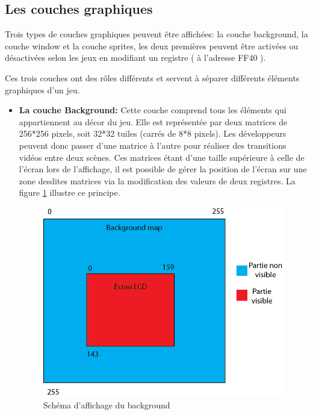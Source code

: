 \documentclass[french]{report}
\begin{document}
\subsection{Les couches graphiques}

Trois types de couches graphiques peuvent être affichées: la couche background, la couche
window et la couche sprites, les deux premières peuvent être activées ou
désactivées selon les jeux en modifiant un registre ( à l'adresse FF40 ).

Ces trois couches ont des rôles différents et servent à séparer différents
éléments graphiques d'un jeu.\\

\begin{itemize}
\item \textbf{La couche Background:}
	Cette couche comprend tous les éléments qui appartiennent au décor du
jeu. Elle est représentée par deux matrices de 256*256 pixels, soit 32*32
tuiles (carrés de 8*8 pixels). Les développeurs peuvent donc passer d'une matrice à
l'autre pour réaliser des transitions vidéos entre deux scènes. Ces matrices étant
d'une taille supérieure à celle de l'écran lors de l'affichage, il est possible de gérer la position de
l'écran sur une zone desdites matrices via la modification des valeurs de
deux registres. La figure \ref{background} illustre ce principe. 
\\

\begin{figure}[!h]
\centering
\includegraphics[scale=0.8]{images/background.png}
\caption{Schéma d'affichage du background}
\label{background}
\end{figure}


\end{itemize}
\end{document}

